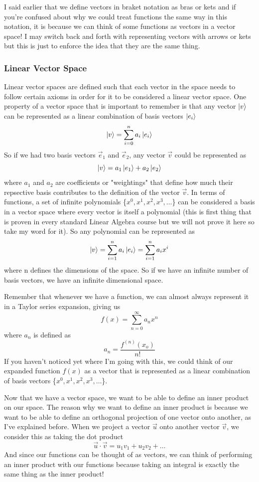\documentclass{article}
\newcommand{\be}{\begin{equation}}
\newcommand{\ee}{\end{equation}}
\begin{document}
I said earlier that we define vectors in braket notation as bras or kets and if you're confused about why we could treat functions the same way in this notation, it is because we can think of some functions as vectors in a vector space!
I may switch back and forth with representing vectors with arrows or kets but this is just to enforce the idea that they are the same thing.

\subsubsection*{Linear Vector Space}
Linear vector spaces are defined such that each vector in the space needs to follow certain axioms in order for it to be considered a linear vector space.
One property of a vector space that is important to remember is that any vector $\ket{v}$ can be represented as a linear combination of basis vectors $\ket{e_i}$
\be
  \ket{v} = \sum_{i = 0}^{n} a_i \ket{e_i}
\ee
So if we had two basis vectors $\vec{e}_1$ and $\vec{e}_2$, any vector $\vec{v}$ could be represented as
\be
  \ket{v} = a_1 \ket{e_1} + a_2 \ket{e_2}
\ee
where $a_1$ and $a_2$ are coefficients or "weightings" that define how much their repsective basis contributes to the definition of the vector $\vec{v}$.
In terms of functions, a set of infinite polynomials \{$x^0, x^1, x^2, x^3, \hdots$\} can be considered a basis in a vector space where every vector is itself a polynomial (this is first thing that is proven in every standard Linear Algebra course but we will not prove it here so take my word for it).
So any polynomial can be represented as
\be
  \ket{v} = \sum_{i=1}^{n} a_i \ket{e_i} = \sum_{i=1}^{n} a_i x^i
\ee
where n defines the dimensions of the space.
So if we have an infinite number of basis vectors, we have an infinite dimensional space.

Remember that whenever we have a function, we can almost always represent it in a Taylor series expansion, giving us
\be
  f(x) = \sum_{n=0}^{\infty} a_n x^n
\ee
where $a_n$ is defined as
\be
  a_n = \frac{f^{(n)}(x_o)}{n!}
\ee
If you haven't noticed yet where I'm going with this, we could think of our expanded function $f(x)$ as a vector that is represented as a linear combination of basis vectors \{$x^0, x^1, x^2, x^3, \hdots$\}.

Now that we have a vector space, we want to be able to define an inner product on our space.
The reason why we want to define an inner product is because we want to be able to define an orthogonal projection of one vector onto another, as I've explained before.
When we project a vector $\vec{u}$ onto another vector $\vec{v}$, we consider this as taking the dot product
\be
  \vec{u} \cdot \vec{v} = u_1v_1 + u_2v_2 + \hdots
\ee
And since our functions can be thought of as vectors, we can think of performing an inner product with our functions because taking an integral is exactly the same thing as the inner product!
\end{document}
